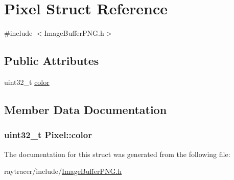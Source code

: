 \hypertarget{struct_pixel}{\section{Pixel Struct Reference}
\label{struct_pixel}
}


{\ttfamily \#include $<$Image\-Buffer\-P\-N\-G.\-h$>$}

\subsection*{Public Attributes}
\begin{DoxyCompactItemize}
\item 
uint32\-\_\-t \hyperlink{struct_pixel_a149e152e0e732eec676e90285e7d3502}{color}
\end{DoxyCompactItemize}


\subsection{Member Data Documentation}
\hypertarget{struct_pixel_a149e152e0e732eec676e90285e7d3502}{
\subsubsection[{color}]{\setlength{\rightskip}{0pt plus 5cm}uint32\-\_\-t Pixel\-::color}}\label{struct_pixel_a149e152e0e732eec676e90285e7d3502}


The documentation for this struct was generated from the following file\-:\begin{DoxyCompactItemize}
\item 
raytracer/include/\hyperlink{_image_buffer_p_n_g_8h}{Image\-Buffer\-P\-N\-G.\-h}\end{DoxyCompactItemize}
